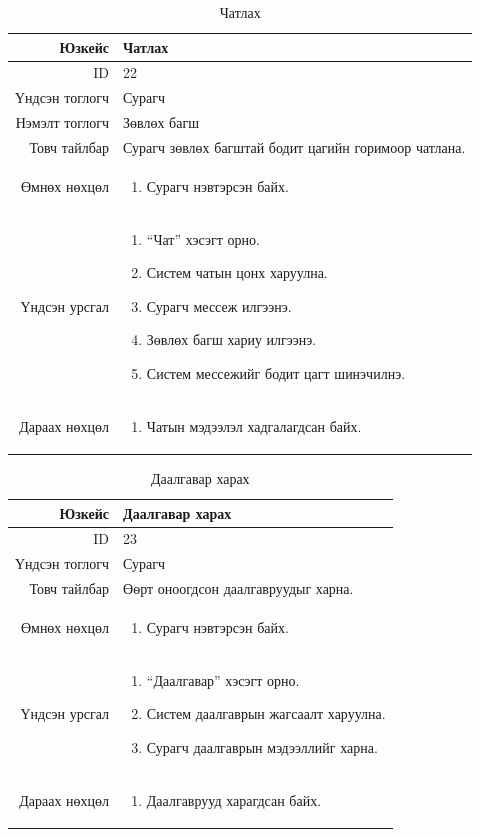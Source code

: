 \begin{longtable}{|r|p{11cm}|}
\caption{Чатлах}
\label{table:usecase22}\\ \hline
Юзкейс & Чатлах \\ \hline
ID & 22 \\ \hline
Үндсэн тоглогч & Сурагч \\ \hline
Нэмэлт тоглогч & Зөвлөх багш \\ \hline
Товч тайлбар & Сурагч зөвлөх багштай
бодит цагийн горимоор чатлана. \\ \hline
Өмнөх нөхцөл &
\begin{enumerate}[nosep]
\item Сурагч нэвтэрсэн байх.
\end{enumerate} \\ \hline
Үндсэн урсгал &
\begin{enumerate}[nosep]
\item ``Чат'' хэсэгт орно.
\item Систем чатын цонх харуулна.
\item Сурагч мессеж илгээнэ.
\item Зөвлөх багш хариу илгээнэ.
\item Систем мессежийг бодит цагт шинэчилнэ.
\end{enumerate} \\ \hline
Дараах нөхцөл &
\begin{enumerate}[nosep]
\item Чатын мэдээлэл хадгалагдсан байх.
\end{enumerate} \\ \hline
\end{longtable}

\begin{longtable}{|r|p{11cm}|}
\caption{Даалгавар харах}
\label{table:usecase23}\\ \hline
Юзкейс & Даалгавар харах \\ \hline
ID & 23 \\ \hline
Үндсэн тоглогч & Сурагч \\ \hline
Товч тайлбар & Өөрт оноогдсон
даалгавруудыг харна. \\ \hline
Өмнөх нөхцөл &
\begin{enumerate}[nosep]
\item Сурагч нэвтэрсэн байх.
\end{enumerate} \\ \hline
Үндсэн урсгал &
\begin{enumerate}[nosep]
\item ``Даалгавар'' хэсэгт орно.
\item Систем даалгаврын жагсаалт харуулна.
\item Сурагч даалгаврын мэдээллийг харна.
\end{enumerate} \\ \hline
Дараах нөхцөл &
\begin{enumerate}[nosep]
\item Даалгаврууд харагдсан байх.
\end{enumerate} \\ \hline
\end{longtable}

